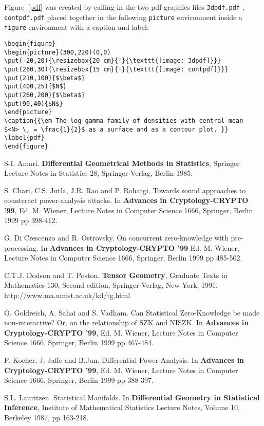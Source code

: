 \documentclass[a4paper,twoside]{article}
\begin{document}
Figure~\ref{pdf} was created by calling in the two pdf graphics files
{\tt 3dpdf.pdf} , {\tt contpdf.pdf}
placed together in the following {\tt picture} environment
inside a {\tt figure} environment with a caption and label:
\begin{verbatim}
\begin{figure}
\begin{picture}(300,220)(0,0)
\put(-20,20){\resizebox{20 cm}{!}{\texttt{[image: 3dpdf]}}}
\put(260,30){\resizebox{15 cm}{!}{\texttt{[image: contpdf]}}}
\put(210,100){$\beta$}
\put(400,25){$N$}
\put(260,200){$\beta$}
\put(90,40){$N$}
\end{picture}
\caption{{\em The log-gamma family of densities with central mean
$<N> \, = \frac{1}{2}$ as a surface and as a contour plot. }}
\label{pdf}
\end{figure}
\end{verbatim}






\begin{thebibliography}{99}
 S-I. Amari. {\bf Differential Geometrical Methods in
Statistics}, Springer Lecture Notes in Statistics 28,
Springer-Verlag, Berlin 1985.

 S. Chari, C.S. Jutla, J.R. Rao and P. Rohatgi.
Towards sound approaches to counteract power-analysis attacks. In
{\bf Advances in Cryptology-CRYPTO '99}, Ed. M. Wiener, Lecture
Notes in Computer Science 1666, Springer, Berlin 1999 pp 398-412.

 G. Di Crescenzo and R. Ostrovsky.
On concurrent zero-knowledge with pre-processing. In {\bf Advances
in Cryptology-CRYPTO '99}  Ed. M. Wiener, Lecture Notes in
Computer Science 1666, Springer, Berlin 1999 pp 485-502.

 C.T.J. Dodson and T. Poston. {\bf Tensor Geometry}, Graduate
Texts in Mathematics 130, Second edition, Springer-Verlag, New
York, 1991. 
{http://www.ma.umist.ac.uk/kd/tg.html}


 O. Goldreich, A. Sahai and S. Vadham.
Can Statistical Zero-Knowledge be made non-interactive? Or, on the
relationship of SZK and NISZK. In {\bf Advances in
Cryptology-CRYPTO '99},  Ed. M. Wiener, Lecture Notes in Computer
Science 1666, Springer, Berlin 1999 pp 467-484.

 P. Kocher, J. Jaffe and B.Jun.
Differential Power Analysis. In {\bf Advances in Cryptology-CRYPTO
'99},  Ed. M. Wiener, Lecture Notes in Computer Science 1666,
Springer, Berlin 1999 pp 388-397.

 S.L. Lauritzen. Statistical Manifolds. In {\bf
Differential Geometry in Statistical Inference}, Institute of
Mathematical Statistics Lecture Notes, Volume 10, Berkeley 1987,
pp 163-218.

\end{thebibliography}
\end{document}

